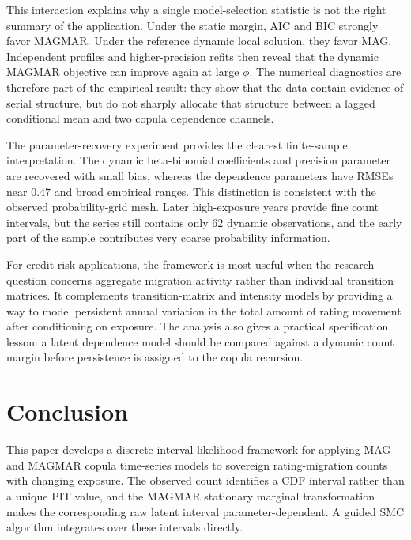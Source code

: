\documentclass[11pt]{article}
\theoremstyle{definition}
\begin{document}
This interaction explains why a single model-selection statistic is not the right
summary of the application. Under the static margin, AIC and BIC strongly favor
MAGMAR. Under the reference dynamic local solution, they favor MAG. Independent
profiles and higher-precision refits then reveal that the dynamic MAGMAR objective
can improve again at large $\phi$. The numerical diagnostics are therefore part of
the empirical result: they show that the data contain evidence of serial structure,
but do not sharply allocate that structure between a lagged conditional mean and two
copula dependence channels.

The parameter-recovery experiment provides the clearest finite-sample interpretation.
The dynamic beta-binomial coefficients and precision parameter are recovered with
small bias, whereas the dependence parameters have RMSEs near 0.47 and broad
empirical ranges. This distinction is consistent with the observed probability-grid
mesh. Later high-exposure years provide fine count intervals, but the series still
contains only 62 dynamic observations, and the early part of the sample contributes
very coarse probability information.

For credit-risk applications, the framework is most useful when the research
question concerns aggregate migration activity rather than individual transition
matrices. It complements transition-matrix and intensity models by providing a way
to model persistent annual variation in the total amount of rating movement after
conditioning on exposure. The analysis also gives a practical specification lesson:
a latent dependence model should be compared against a dynamic count margin before
persistence is assigned to the copula recursion.

\section{Conclusion}
\label{sec:conclusion}

This paper develops a discrete interval-likelihood framework for applying MAG and
MAGMAR copula time-series models to sovereign rating-migration counts with changing
exposure. The observed count identifies a CDF interval rather than a unique PIT
value, and the MAGMAR stationary marginal transformation makes the corresponding raw
latent interval parameter-dependent. A guided SMC algorithm integrates over these
intervals directly.
\end{document}
